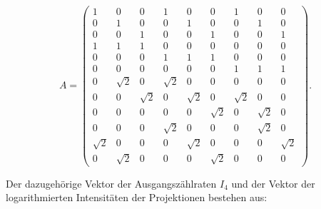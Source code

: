  \begin{equation*}
   A = \begin{pmatrix}
              1 & 0 & 0 & 1 & 0 & 0 & 1 & 0 & 0 \\
              0 & 1 & 0 & 0 & 1 & 0 & 0 & 1 & 0 \\
              0 & 0 & 1 & 0 & 0 & 1 & 0 & 0 & 1 \\
              1 & 1 & 1 & 0 & 0 & 0 & 0 & 0 & 0 \\
              0 & 0 & 0 & 1 & 1 & 1 & 0 & 0 & 0 \\
              0 & 0 & 0 & 0 & 0 & 0 & 1 & 1 & 1 \\
              0 & \sqrt{2} & 0 & \sqrt{2} & 0 & 0 & 0 & 0 & 0 \\
              0 & 0 & \sqrt{2} & 0 & \sqrt{2} & 0 & \sqrt{2} & 0 & 0 \\
              0 & 0 & 0 & 0 & 0 & \sqrt{2} & 0 & \sqrt{2} & 0 \\
              0 & 0 & 0 & \sqrt{2} & 0 & 0 & 0 & \sqrt{2} & 0 \\
              \sqrt{2} & 0 & 0 & 0 & \sqrt{2} & 0 & 0 & 0 & \sqrt{2} \\
              0 & \sqrt{2} & 0 & 0 & 0 & \sqrt{2} & 0 & 0 & 0
      \end{pmatrix}.
      \label{eqn:matrix}
 \end{equation*}

Der dazugehörige Vektor der Ausgangszählraten $I_4$ und der Vektor der
logarithmierten Intensitäten der
Projektionen bestehen aus:

